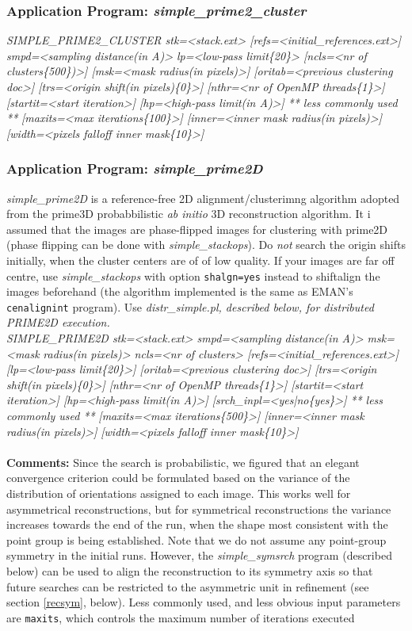 \documentclass[review]{elsarticle}
\begin{document}
{{\subsubsection{Application Program: {\it{simple\_prime2\_cluster}}}
\label{prime2_cluster}
{\it{SIMPLE\_PRIME2\_CLUSTER stk=<stack.ext> [refs=<initial\_references.ext>]}}
{\it{smpd=<sampling distance(in A)> lp=<low-pass limit\{20\}> [ncls=<nr of}}
{\it{clusters\{500\})>] [msk=<mask radius(in pixels)>] [oritab=<previous clustering}}
{\it{doc>] [trs=<origin shift(in pixels)\{0\}>] [nthr=<nr of OpenMP threads\{1\}>]}}
{\it{[startit=<start iteration>] [hp=<high-pass limit(in A)>]}}
{\it{** less commonly used **}}
{\it{[maxits=<max iterations\{100\}>] [inner=<inner mask radius(in pixels)>]}}
{\it{[width=<pixels falloff inner mask\{10\}>]}}

\subsubsection{Application Program: {\it{simple\_prime2D}}}
\label{prime2D}
{\it{simple\_prime2D}} is a reference-free 2D alignment/clusterimng algorithm adopted from the prime3D probabbilistic \textit{ab initio} 3D reconstruction algorithm. It i assumed that the images are phase-flipped images for clustering with prime2D (phase flipping can be done with {\it{simple\_stackops}}). Do \textit{not} search the origin shifts initially, when the cluster centers are of of low quality. If your images are far off centre, use {\it{simple\_stackops}} with option \texttt{shalgn=yes} instead to shiftalign the images beforehand (the algorithm implemented is the same as EMAN's \texttt{cenalignint} program). Use {\it{distr\_simple.pl}, described below, for distributed PRIME2D execution.}\\
{\it{SIMPLE\_PRIME2D stk=<stack.ext> smpd=<sampling distance(in A)> msk=<mask}}
{\it{radius(in pixels)> ncls=<nr of clusters> [refs=<initial\_references.ext>]}}
{\it{[lp=<low-pass limit\{20\}>] [oritab=<previous clustering doc>] [trs=<origin}}
{\it{shift(in pixels)\{0\}>] [nthr=<nr of OpenMP threads\{1\}>] [startit=<start}}
{\it{iteration>] [hp=<high-pass limit(in A)>] [srch\_inpl=<yes|no\{yes\}>]}}
{\it{** less commonly used **}}
{\it{[maxits=<max iterations\{500\}>] [inner=<inner mask radius(in pixels)>]}}
{\it{[width=<pixels falloff inner mask\{10\}>]}}
\\\\
\noindent\textbf{Comments:} Since the search is probabilistic, we figured that an elegant convergence criterion could be formulated based on the variance of the distribution of orientations assigned to each image. This works well for asymmetrical reconstructions, but for symmetrical reconstructions the variance increases towards the end of the run, when the shape most consistent with the point group is being established. Note that we do not assume any point-group symmetry in the initial runs. However, the {\it{simple\_symsrch}} program (described below) can be used to align the reconstruction to its symmetry axis so that future searches can be restricted to the asymmetric unit in refinement (see section \ref{recsym}, below). Less commonly used, and less obvious input parameters are \texttt{maxits}, which controls the maximum number of iterations executed

}}
\end{document}
